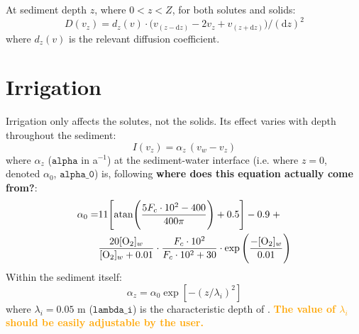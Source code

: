 \documentclass[a4paper]{article}
\newcommand{\D}[1]{\mathrm{d}#1}
\newcommand{\code}[1]{\texttt{#1}}
\newcommand{\wtf}[1]{\textcolor{Cerulean}{\textbf{#1}}}
\newcommand{\codenote}[1]{\textcolor{Orange}{\textbf{#1}}}
\begin{document}
At sediment depth $z$, where $0 < z < Z$, for both solutes and solids:
\begin{equation}\label{eq:diffusion}
D(v_z) = d_z(v) \cdot \big( v_{(z-\D{z})} - 2 v_z + v_{(z+\D{z})} \big) / (\D{z})^2
\end{equation}
where $d_z(v)$ is the relevant diffusion coefficient.



\section{Irrigation}\label{sx:irrigation}

Irrigation only affects the solutes, not the solids. Its effect varies with depth throughout the sediment:
\begin{equation}
I(v_z) = \alpha_z \, (v_w - v_z)
\end{equation}
where $\alpha_z$ ($\code{alpha}$ in a$^{-1}$) at the sediment-water interface (i.e. where $z = 0$, denoted $\alpha_0$, $\code{alpha\_0}$) is, following \wtf{where does this equation actually come from?}:
\begin{equation}
\begin{split}
\alpha_0 = & 11 \Bigg[ \mathrm{atan} \Bigg( \frac{5 F_c \cdot 10^2 - 400}{400 \pi} \Bigg) + 0.5 \Bigg] - 0.9 \; + \\
& \frac{20 [\ce{O2}]_w}{[\ce{O2}]_w + 0.01} \cdot \frac{F_c \cdot 10^2}{F_c \cdot 10^2 + 30} \cdot \exp \Bigg(\frac{-[\ce{O2}]_w}{0.01}\Bigg)
\end{split}
\end{equation}
Within the sediment itself:
\begin{equation}
\alpha_z = \alpha_0 \exp [-(z/\lambda_i)^2]
\end{equation}
where $\lambda_i = 0.05$ m ($\code{lambda\_i}$) is the characteristic depth of \citet{archer_model_2002}. \codenote{The value of $\lambda_i$ should be easily adjustable by the user.}



\end{document}
